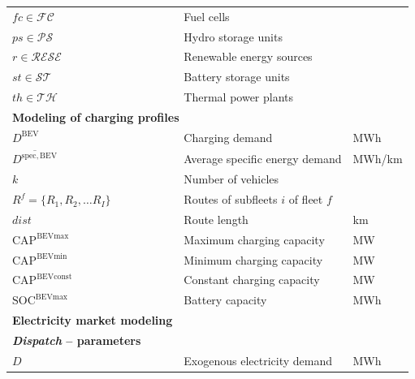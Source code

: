 \documentclass[final,10pt]{elsarticle}
\begin{document}
\begin{table}[H]
\begin{tabular}{lll}
$fc \in \mathcal{FC}$                          & Fuel cells                                             &                            \\
$ps \in \mathcal{PS}$                          & Hydro storage units                                    &                            \\
$r \in \mathcal{RESE}$                         & Renewable energy sources                               &                            \\
${st} \in \mathcal{ST}$                        & Battery storage units                                  &                            \\
$th \in \mathcal{TH}$                          & Thermal power plants                                   &                            \\ \hline
\multicolumn{3}{l}{\textbf{Modeling of charging profiles}}                                                                  \\ \hline
$D^{\mathrm{BEV}}$ &
  Charging demand  &
  MWh \\
$\overline{D^{\mathrm{spec, BEV}}}$ &
  Average specific energy demand &
  MWh/km \\
$k$                                            & Number of vehicles                                     &                            \\
$R^f = \{R_1, R_2, \dots R_I\}$                & Routes of subfleets $i$ of fleet $f$                   &                            \\
$dist$                                         & Route length                                           & km                         \\
$\mathrm{CAP}^{\mathrm{BEV max}}$ &
  Maximum charging capacity  &
  MW \\
  $\mathrm{CAP}^{\mathrm{BEV min}}$ &
  Minimum charging capacity&
  MW \\
$\mathrm{CAP}^{\mathrm{BEV const}}$ &
  Constant charging capacity&
  MW \\
  $\mathrm{SOC}^{\mathrm{BEV max}}$ &
  Battery capacity &
  MWh \\\hline
\textbf{Electricity market modeling}           &                                                        &                            \\ \hline
\multicolumn{3}{l}{\textbf{\textit{Dispatch} – parameters}}                                                                          \\
$D$                                            & Exogenous electricity demand                           & MWh                        \\


\end{tabular}
\end{table}
\end{document}
